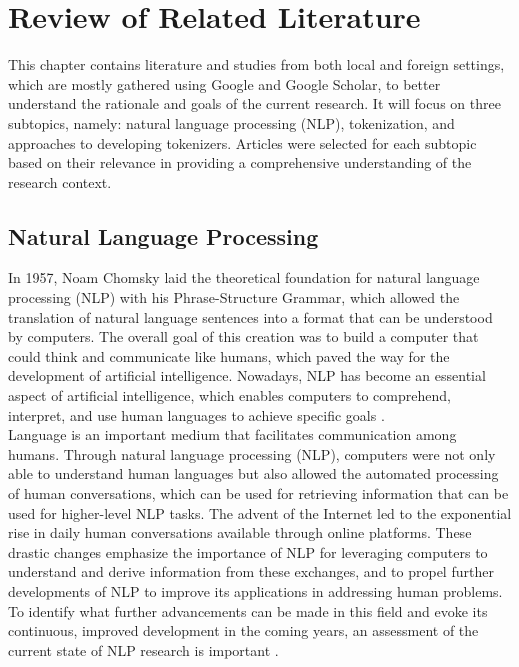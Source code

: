 \documentclass[journal]{./IEEE/IEEEtran}
\begin{document}
\newpage

\section{Review of Related Literature}

This chapter contains literature and studies from both local and foreign settings, which are mostly gathered using Google and Google Scholar, to better understand the rationale and goals of the current research. It will focus on three subtopics, namely: natural language processing (NLP), tokenization, and approaches to developing tokenizers. Articles were selected for each subtopic based on their relevance in providing a comprehensive understanding of the research context.

\subsection {Natural Language Processing}

In 1957, Noam Chomsky laid the theoretical foundation for natural language processing (NLP) with his Phrase-Structure Grammar, which allowed the translation of natural language sentences into a format that can be understood by computers. The overall goal of this creation was to build a computer that could think and communicate like humans, which paved the way for the development of artificial intelligence. Nowadays, NLP has become an essential aspect of artificial intelligence, which enables computers to comprehend, interpret, and use human languages to achieve specific goals {\cite{NLPHist}}. \\

Language is an important medium that facilitates communication among humans. Through natural language processing (NLP), computers were not only able to understand human languages but also allowed the automated processing of human conversations, which can be used for retrieving information that can be used for higher-level NLP tasks. The advent of the Internet led to the exponential rise in daily human conversations available through online platforms.  These drastic changes emphasize the importance of NLP for leveraging computers to understand and derive information from these exchanges, and to propel further developments of NLP to improve its applications in addressing human problems. To identify what further advancements can be made in this field and evoke its continuous, improved development in the coming years, an assessment of the current state of NLP research is important {\cite{NLPInPH}}. \\
\end{document}
